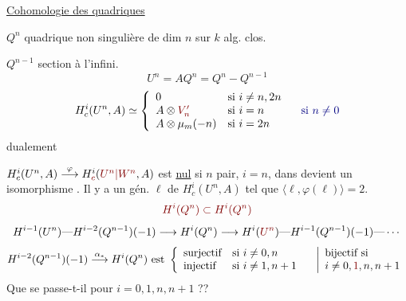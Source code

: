 \uline{Cohomologie des quadriques}

$Q^n$ quadrique non singulière de dim $n$ sur $k$ alg. clos.

$Q^{n-1}$ section à l'infini.
\[
U^n=AQ^n=Q^n-Q^{n-1}
\]
\[
H_c^i(U^n,A)\simeq
\left\{\begin{array}{ll}
0&\text{si }i\neq n,2n\\
A\otimes\unsure{V'_n}&\text{si }i=n\\
A\otimes\mu_m(-n)&\text{si }i=2n
\end{array}\right.
\quad\inserted{\text{si }n\neq0}
\]
\margin{\[
\unsure{V'_n}=\check V_n\otimes\mu_m(-n)=
\begin{cases}
\mu_m(-\frac n2)&n\text{ pair}\\
\mu_m(\unsure{-\frac{n+1}{2}})&n\text{ imp.}
\end{cases}
\]
\[
V'_n=V_n=\mu_m(-\tfrac n2)\quad n\text{ pair}
\]
\[
V'_n=V_n\otimes\mu_m(1)\quad n\text{ impair}
\]}
dualement
\diagram{\[
H^i(U^n,A)\simeq
\left\{\begin{gathered}
\begin{tikzcd}[column sep=small,row sep=small]
0 & \text{si }i\neq0,n\\
A\otimes V_n \arrow[d,bend right=30] & i=0\\
A \arrow[u,bend left=50] & \text{si }i=n.
\end{tikzcd}
\end{gathered}\right.
\]}

$H_c^i(U^n,A)\overset{\varphi}{\longrightarrow}H_{\unsure{c}}^i(\unsure{U^n|W^n},A)$ est \uline{nul}  si $n$ pair, $i=n$, dans  devient un isomorphisme . Il y a un gén. $\ell$ de $H_c^i(U^n,A)$ tel que $\langle\ell,\varphi(\ell)\rangle=2$.
\[
\deleted{\unsure{H^i(Q^n)\subset H^i(Q^n)}}
\]
\[
H^{i-1}(U^n)\text{---}H^{i-2}(Q^{n-1})(-1)\longrightarrow H^i(Q^n)
\longrightarrow H^i(\unsure{U^n})\text{---}H^{i-1}(Q^{n-1})(-1)\text{---}\cdots
\]
\[
H^{i-2}(Q^{n-1})(-1)\overset{\alpha_*}{\longrightarrow}H^i(Q^n)
\text{ est }\left\{\begin{array}{ll}
\text{surjectif}&\text{si }i\neq0,n\\
\text{injectif}&\text{si }i\neq1,n+1
\end{array}\right.
\quad
\left|\begin{array}{l}
\text{bijectif si}\\
i\neq0,\unsure{1},n,n+1
\end{array}\right.
\]
Que se passe-t-il pour $i=0,1,n,n+1$ ??
    
